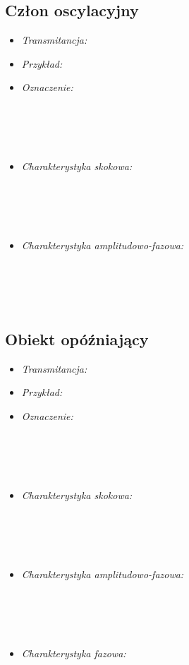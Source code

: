 \documentclass[a4paper]{article}
\begin{document}
\subsection{Człon oscylacyjny}
\begin{itemize}
\item \emph{Transmitancja: } 
\item \emph{Przykład: }  
\item \emph {Oznaczenie: } \\\\\\\\\\
\item \emph{Charakterystyka skokowa: } \\\\\\\\\\
\item \emph{Charakterystyka amplitudowo-fazowa: } \\\\\\\\\\
\end{itemize}
\subsection{Obiekt opóźniający}
\begin{itemize}
\item \emph{Transmitancja: } 
\item \emph{Przykład: } 
\item \emph {Oznaczenie: } \\\\\\\\\\
\item \emph{Charakterystyka skokowa: } \\\\\\\\\\
\item \emph{Charakterystyka amplitudowo-fazowa: } \\\\\\\\\\
\item \emph{Charakterystyka fazowa: } \\\\\\\\\\
\end{itemize}
\iffalse
\end{document}

